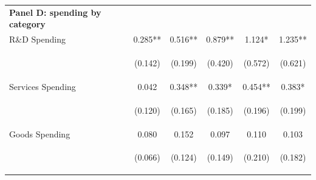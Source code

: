 \documentclass[dv_diss_main.tex]{subfiles}
\begin{document}
\begin{table}[H]
\begin{center}
{\begin{tabular}{lccccc}
    \multicolumn{1}{l}{\textbf{Panel D: spending by category}} & & & & \\ 
   R\&D Spending & 0.285** & 0.516** & 0.879** & 1.124* & 1.235** \\
    \vspace{4pt} & \begin{footnotesize}(0.142)\end{footnotesize} & \begin{footnotesize}(0.199)\end{footnotesize} & \begin{footnotesize}(0.420)\end{footnotesize} & \begin{footnotesize}(0.572)\end{footnotesize} & \begin{footnotesize}(0.621)\end{footnotesize} \\
    Services Spending & 0.042 & 0.348** & 0.339* & 0.454** & 0.383* \\
    \vspace{4pt} & \begin{footnotesize}(0.120)\end{footnotesize} & \begin{footnotesize}(0.165)\end{footnotesize} & \begin{footnotesize}(0.185)\end{footnotesize} & \begin{footnotesize}(0.196)\end{footnotesize} & \begin{footnotesize}(0.199)\end{footnotesize} \\
    Goods Spending & 0.080 & 0.152 & 0.097 & 0.110 & 0.103 \\
     & \begin{footnotesize}(0.066)\end{footnotesize} & \begin{footnotesize}(0.124)\end{footnotesize} & \begin{footnotesize}(0.149)\end{footnotesize} & \begin{footnotesize}(0.210)\end{footnotesize} & \begin{footnotesize}(0.182)\end{footnotesize} \\


\end{tabular}}
\end{center}
\end{table}
\end{document}
